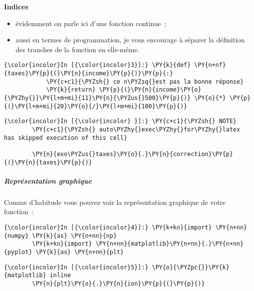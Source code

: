     \textbf{Indices}

\begin{itemize}
\tightlist
\item
  évidemment on parle ici d'une fonction continue~;
\item
  aussi en termes de programmation, je vous encourage à séparer la
  définition des tranches de la fonction en elle-même.
\end{itemize}

    \begin{Verbatim}[commandchars=\\\{\}]
{\color{incolor}In [{\color{incolor}3}]:} \PY{k}{def} \PY{n+nf}{taxes}\PY{p}{(}\PY{n}{income}\PY{p}{)}\PY{p}{:}
            \PY{c+c1}{\PYZsh{} ce n\PYZsq{}est pas la bonne réponse}
            \PY{k}{return} \PY{p}{(}\PY{n}{income}\PY{o}{\PYZhy{}}\PY{l+m+mi}{11}\PY{n}{\PYZus{}500}\PY{p}{)} \PY{o}{*} \PY{p}{(}\PY{l+m+mi}{20}\PY{o}{/}\PY{l+m+mi}{100}\PY{p}{)}
\end{Verbatim}


    \begin{Verbatim}[commandchars=\\\{\}]
{\color{incolor}In [{\color{incolor} }]:} \PY{c+c1}{\PYZsh{} NOTE}
        \PY{c+c1}{\PYZsh{} auto\PYZhy{}exec\PYZhy{}for\PYZhy{}latex has skipped execution of this cell}
        
        \PY{n}{exo\PYZus{}taxes}\PY{o}{.}\PY{n}{correction}\PY{p}{(}\PY{n}{taxes}\PY{p}{)}
\end{Verbatim}


    \hypertarget{repruxe9sentation-graphique}{%
\subparagraph{Représentation
graphique}\label{repruxe9sentation-graphique}}

    Comme d'habitude vous pouvez voir la représentation graphique de votre
fonction~:

    \begin{Verbatim}[commandchars=\\\{\}]
{\color{incolor}In [{\color{incolor}4}]:} \PY{k+kn}{import} \PY{n+nn}{numpy} \PY{k}{as} \PY{n+nn}{np}
        \PY{k+kn}{import} \PY{n+nn}{matplotlib}\PY{n+nn}{.}\PY{n+nn}{pyplot} \PY{k}{as} \PY{n+nn}{plt}
\end{Verbatim}


    \begin{Verbatim}[commandchars=\\\{\}]
{\color{incolor}In [{\color{incolor}5}]:} \PY{o}{\PYZpc{}}\PY{k}{matplotlib} inline
        \PY{n}{plt}\PY{o}{.}\PY{n}{ion}\PY{p}{(}\PY{p}{)}
\end{Verbatim}


